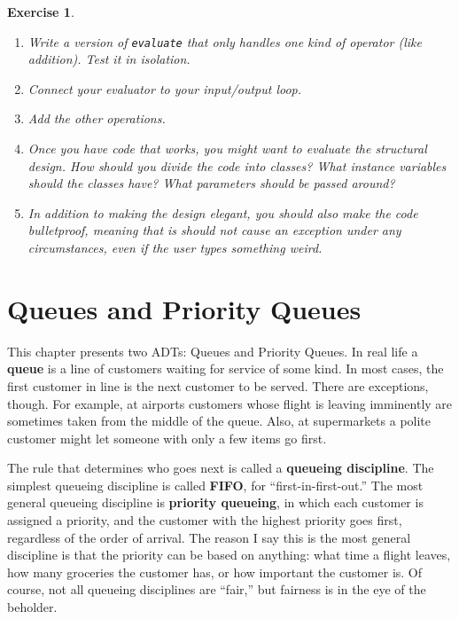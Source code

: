 \documentclass[12pt]{book}
\theoremstyle{exercise}
\newtheorem{exercise}{Exercise}[chapter]
\begin{document}
\begin{exercise}
\begin {enumerate}
\item Write a version of {\tt evaluate} that only handles one
kind of operator (like addition).  Test it in isolation.

\item Connect your evaluator to your input/output loop.

\item Add the other operations.

\item Once you have code that works, you might want to evaluate
the structural design.  How should you divide the code into
classes?  What instance variables should the classes have?  What
parameters should be passed around?

\item In addition to making the design elegant, you should also
make the code bulletproof, meaning that is should not cause an
exception under any circumstances, even if the user types something
weird.

\end{enumerate}
\end{exercise}




\chapter{Queues and Priority Queues}
\label{queue}

This chapter presents two ADTs: Queues and Priority Queues.
In real life a {\bf queue} is a line of customers waiting for service
of some kind.  In most cases, the first customer in line is the
next customer to be served.  There are exceptions, though.  For
example, at airports customers whose flight is leaving imminently
are sometimes taken from the middle of the queue.  Also, at
supermarkets a polite customer might let someone with only a
few items go first.

The rule that determines who goes next is called a 
{\bf queueing discipline}.  The simplest queueing discipline is
called {\bf FIFO}, for ``first-in-first-out.''  The most general
queueing discipline is {\bf priority queueing}, in which each customer
is assigned a priority, and the customer with the highest priority
goes first, regardless of the order of arrival.  The reason I
say this is the most general discipline is that the priority
can be based on anything: what time a flight leaves, how many
groceries the customer has, or how important the customer is.
Of course, not all queueing disciplines are ``fair,'' but
fairness is in the eye of the beholder.
\end{document}
